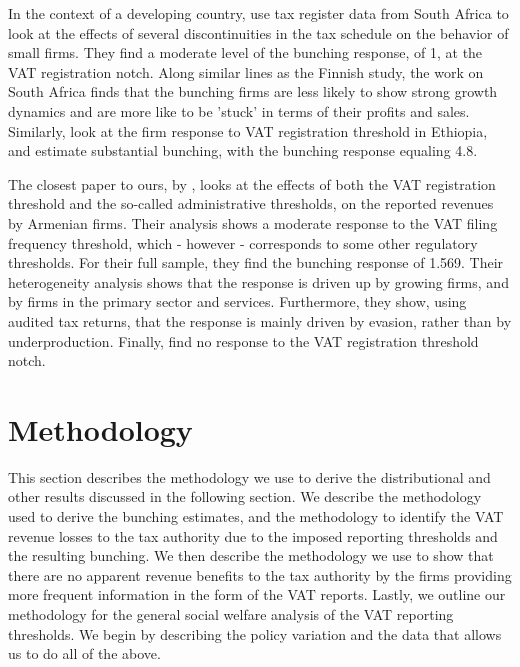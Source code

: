 In the context of a developing country, \citet{boonzaaier2017small} use tax register data from South Africa to look at the effects of several discontinuities in the tax schedule on the behavior of small firms. They find a moderate level of the bunching response, of 1, at the VAT registration notch. Along similar lines as the Finnish study, the work on South Africa finds that the bunching firms are less likely to show strong growth dynamics and are more like to be 'stuck' in terms of their profits and sales. Similarly, \citet{gebresilasse2016firm} look at the firm response to VAT registration threshold in Ethiopia, and estimate substantial bunching, with the bunching response equaling 4.8.  

The closest paper to ours, by \citet{asatryan2017responses}, looks at the effects of both the VAT registration threshold and the so-called administrative thresholds, on the reported revenues by Armenian firms. Their analysis shows a moderate response to the VAT filing frequency threshold, which - however - corresponds to some other regulatory thresholds. For their full sample, they find the bunching response of 1.569. Their heterogeneity analysis shows that the response is driven up by growing firms, and by firms in the primary sector and services. Furthermore, they show, using audited tax returns, that the response is mainly driven by evasion, rather than by underproduction. Finally, \citet{asatryan2017responses} find no response to the VAT registration threshold notch. 

\section{Methodology}
\label{sec:3-methodology}
This section describes the methodology we use to derive the distributional and other results discussed in the following section. We  describe the methodology used to derive the bunching estimates, and the methodology to identify the VAT revenue losses to the tax authority due to the imposed reporting thresholds and the resulting bunching. We then describe the methodology we use to show that there are no apparent revenue benefits to the tax authority by the firms providing more frequent information in the form of the VAT reports. Lastly, we outline our methodology for the general social welfare analysis of the VAT reporting thresholds. We begin by  describing the policy variation and the data that allows us to do all of the above.

